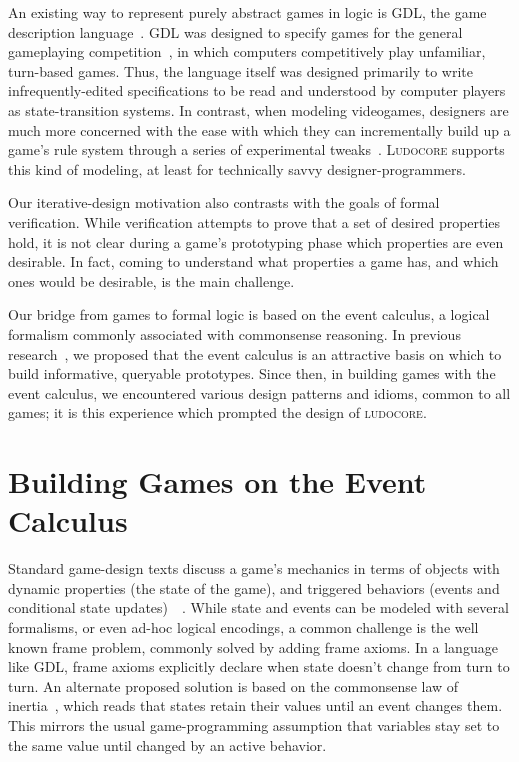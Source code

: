 \documentclass[conference]{IEEEtran}
\newcommand{\ludocore}{\textsc{ludocore}}
\newcommand{\Ludocore}{\textsc{Ludocore}}
\begin{document}
An existing way to represent purely abstract games in logic is GDL, the game
description language~\citep{GDL}. GDL was designed to specify games for the
general gameplaying competition~\citep{GGP}, in which computers competitively
play unfamiliar, turn-based games. Thus, the language itself was designed
primarily to write infrequently-edited specifications to be read and understood
by computer players as state-transition systems. In contrast, when modeling
videogames, designers are much more concerned with the ease with which they can
incrementally build up a game's rule system through a series of
experimental tweaks~\citep[p.\ 14]{Fullerton}. \Ludocore{} supports this
kind of modeling, at least for technically savvy designer-programmers.

Our iterative-design motivation also contrasts with the goals of formal
verification. While verification attempts to prove that a set of desired
properties hold, it is not clear during a game's prototyping phase which
properties are even desirable. In fact, coming to understand what properties a
game has, and which ones would be desirable, is the main challenge.

Our bridge from games to formal logic is based on the event calculus, a logical
formalism commonly associated with commonsense reasoning. In previous
research~\citep{AIIDE08}, we proposed that the event calculus is an attractive
basis on which to build informative, queryable prototypes. Since then, in
building games with the event calculus, we encountered various design patterns
and idioms, common to all games; it is this experience which prompted the
design of \ludocore.

\section{Building Games on the Event Calculus}

Standard game-design texts discuss a game's mechanics in terms of objects with
dynamic properties (the state of the game), and triggered behaviors (events and
conditional state updates)~\citep[p.\ 295]{Adams}~\citep[p.\ 112]{Fullerton}.
While state and events can be modeled with several
formalisms, or even ad-hoc logical encodings, a common challenge is the well
known frame problem, commonly solved by adding frame axioms. In a language like
GDL, frame axioms explicitly declare when state doesn't change from turn to
turn.  An alternate proposed solution is based on the commonsense law of
inertia~\citep{Shanahan:inertia}, which reads that states retain their values
until an event changes them. This mirrors the usual game-programming assumption
that variables stay set to the same value until changed by an active behavior.
\end{document}
